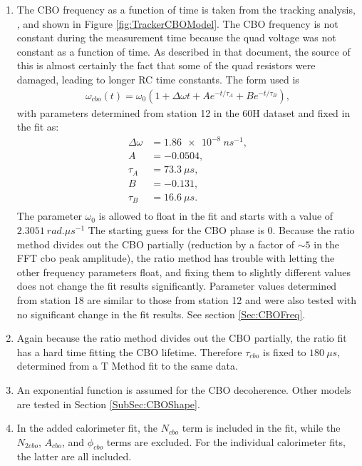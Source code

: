 	\begin{enumerate}
		\item{The CBO frequency as a function of time is taken from the tracking analysis, , and shown in Figure \ref{fig:TrackerCBOModel}. The CBO frequency is not constant during the measurement time because the quad voltage was not constant as a function of time. As described in that document, the source of this is almost certainly the fact that some of the quad resistors were damaged, leading to longer RC time constants. The form used is 
			\begin{gather}
				\omega_{cbo}(t) = \omega_{0}(1 + \Delta\omega t + A e^{-t/\tau_{A}} + B e^{-t/\tau_{B}}),
			\label{Eqn:CBOFreq}
			\end{gather}
		with parameters determined from station 12 in the 60H dataset and fixed in the fit as:
			\begin{equation*}	
			\begin{aligned}
			 	\Delta\omega &= \SI{1.86e-8}{ns^{-1}}, \\
			 	A &= -0.0504, \\
			 	\tau_{A} &= \SI{73.3}{\mu s}, \\
			 	B &= -0.131, \\
			 	\tau_{B} &= \SI{16.6}{\mu s}. \\
			\end{aligned}
			\end{equation*}
		The parameter $\omega_{0}$ is allowed to float in the fit and starts with a value of $\SI{2.3051}{rad.\mu s^{-1}}$ The starting guess for the CBO phase is 0. Because the ratio method divides out the CBO partially (reduction by a factor of $\sim5$ in the FFT cbo peak amplitude), the ratio method has trouble with letting the other frequency parameters float, and fixing them to slightly different values does not change the fit results significantly. Parameter values determined from station 18 are similar to those from station 12 and were also tested with no significant change in the fit results. See section \ref{Sec:CBOFreq}.}
		\item{Again because the ratio method divides out the CBO partially, the ratio fit has a hard time fitting the CBO lifetime. Therefore $\tau_{cbo}$ is fixed to $\SI{180}{\mu s}$, determined from a T Method fit to the same data.}
		\item{An exponential function is assumed for the CBO decoherence. Other models are tested in Section \ref{SubSec:CBOShape}.}
		\item{In the added calorimeter fit, the $N_{cbo}$ term is included in the fit, while the $N_{2cbo}$, $A_{cbo}$, and $\phi_{cbo}$ terms are excluded. For the individual calorimeter fits, the latter are all included.}

\end{enumerate}

